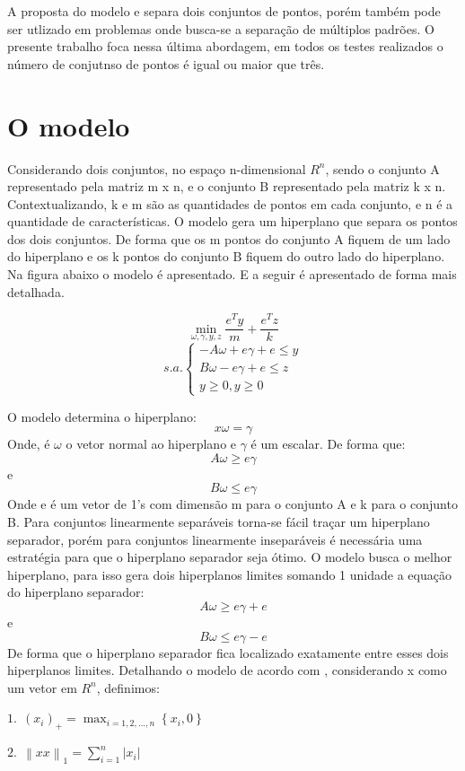 A proposta do modelo e separa dois conjuntos de pontos, porém também pode ser utlizado em problemas onde busca-se a separação de múltiplos padrões. O presente trabalho foca nessa última abordagem, em todos os testes realizados o número de conjutnso de pontos é igual ou maior que três.

\section{O modelo}
Considerando dois conjuntos, no espaço n-dimensional $ R^{n} $, sendo o conjunto A representado pela matriz m x n, e o conjunto B representado pela matriz k x n. Contextualizando, k e m são as quantidades de pontos em cada conjunto, e n é a quantidade de características. O modelo gera um hiperplano que separa os pontos dos dois conjuntos. De forma que os m pontos do conjunto A fiquem de um lado do hiperplano e os k pontos do conjunto B fiquem do outro lado do hiperplano. Na figura abaixo o modelo é apresentado. E a seguir é apresentado de forma mais detalhada.

$$\min_{\omega ,\gamma ,y,z}\frac{e^{T}y}{m}+\frac{e^{T}z}{k}$$
$$s.a.\left\{\begin{matrix}-A\omega +e\gamma+e\leq y\\B\omega -e\gamma+e\leq  z\\ y\geq 0,y\geq 0\end{matrix}\right.$$

O modelo determina o hiperplano:
$$ x\omega = \gamma $$
Onde,  é $\omega$ o vetor normal ao hiperplano e $\gamma$ é um escalar. De forma que:
$$A\omega \geq e\gamma$$
e
$$B\omega \leq e\gamma$$
Onde e é um vetor de 1’s com dimensão m para o conjunto A e k para o conjunto B.
Para conjuntos linearmente separáveis torna-se fácil traçar um hiperplano separador, porém para conjuntos linearmente inseparáveis é necessária uma estratégia para que o hiperplano separador seja ótimo.
O modelo busca o melhor hiperplano, para isso gera dois hiperplanos limites somando 1 unidade a equação do hiperplano separador:
$$A\omega \geq e\gamma + e$$
e
$$B\omega \leq e\gamma - e$$
De forma que o hiperplano separador fica localizado exatamente entre esses dois hiperplanos limites.
Detalhando o modelo de acordo com , considerando x como um vetor em $ R^{n} $, definimos:

$1.\ \ (x_{i})_{+} = \max_{i=1,2,...,n}{\left \{x_{i},0  \right \}}$

$2.\ \ \left \| xx \right \|_{1} = \sum_{i=1}^{n}\left | x_{i} \right |$

